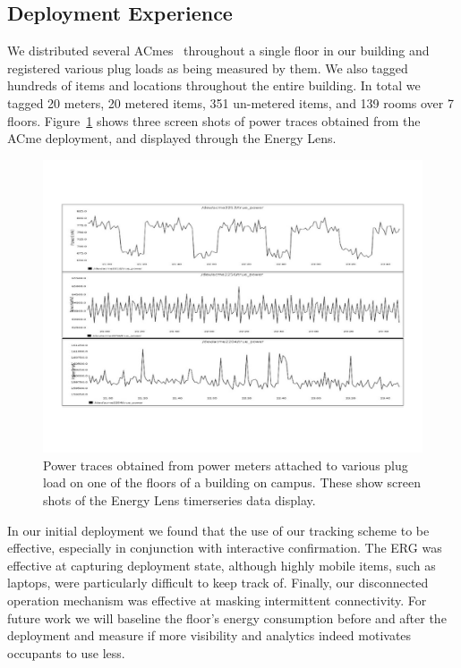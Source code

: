 \subsection{Deployment Experience}
\label{sec:depexp}

We distributed several ACmes~\cite{acmemeter} throughout a single floor in our building and registered various plug loads as being measured by them.  We also tagged
hundreds of items and locations throughout the entire building.  In total we tagged 20 meters, 20 metered items, 351 un-metered items,
 and 139 rooms over 7 floors.  Figure~\ref{fig:tsdata} shows three screen shots of power traces obtained from the ACme deployment, and displayed
 through the Energy Lens. 

\begin{figure}[htb!]
\begin{center}
\includegraphics[scale=0.33]{figs/graphs_screen}
\caption{Power traces obtained from power meters attached to various plug load on one of the floors of
a building on campus.  These show screen shots of the Energy Lens timerseries data display.}
\label{fig:tsdata}
\end{center}
\end{figure}

In our initial deployment we found that the use of our tracking scheme to be effective, especially in conjunction with
interactive confirmation.  The ERG was effective at capturing deployment state, although highly mobile items, such as laptops,
were particularly difficult to keep track of.  Finally, our disconnected operation mechanism was effective at masking 
intermittent connectivity.  For future work we will baseline the floor's energy consumption before and after the deployment 
and measure if more visibility and analytics indeed motivates occupants to use less.


